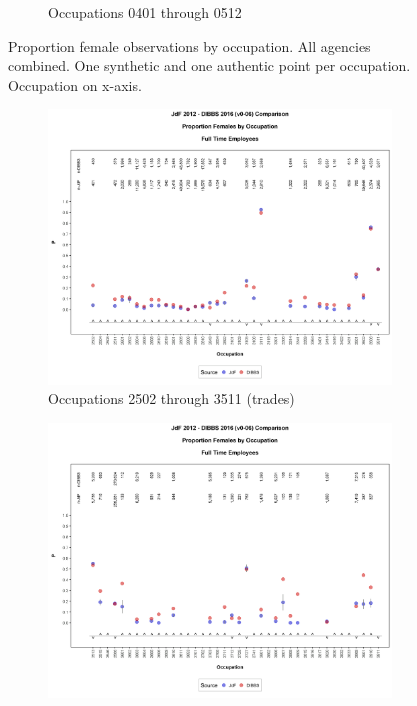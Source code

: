 \documentclass[10pt, letterpaper]{article}
\begin{document}
\begin{spacing}{1.0}
\begin{figure}[h]
\begin{subfigure}{1\textwidth}
        \caption{Occupations 0401 through 0512}
        \vspace{10pt}
    \end{subfigure}
    \caption{Proportion female observations by occupation.  All agencies combined.  One synthetic and one authentic point per occupation.  Occupation on x-axis.}
    \label{figure:JdFDIBBSOccupationProportionBar2}
\end{figure}

\clearpage

\begin{figure}[h]
    \centering
    \begin{subfigure}{1\textwidth}
        \centering
        \includegraphics[width=6in, trim={0 1in 0 1in}, clip]{JdFDIBBSOccupationProportionBar481.png}
        \caption{Occupations 2502 through 3511 (trades)}
        \vspace{10pt}
    \end{subfigure}
    \begin{subfigure}{1\textwidth}
        \centering
        \includegraphics[width=6in, trim={0 1in 0 1in}, clip]{JdFDIBBSOccupationProportionBar521.png}

\end{subfigure}
\end{figure}
\end{spacing}
\end{document}
